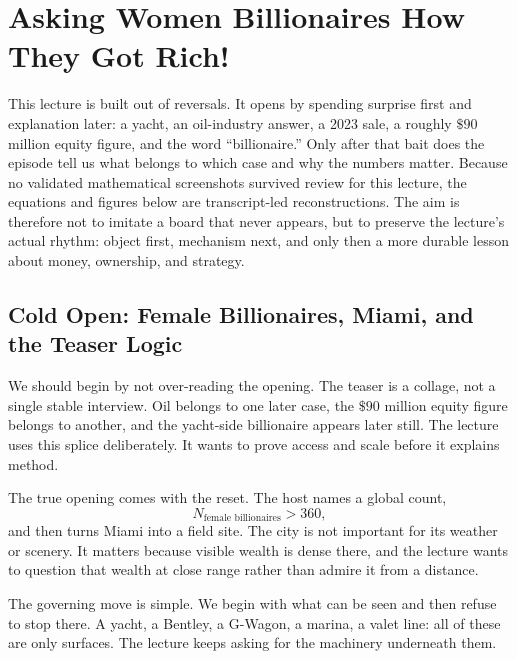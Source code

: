 \chapter{Asking Women Billionaires How They Got Rich!}

This lecture is built out of reversals. It opens by spending surprise first and explanation later: a yacht, an oil-industry answer, a 2023 sale, a roughly \(\$90\) million equity figure, and the word ``billionaire.'' Only after that bait does the episode tell us what belongs to which case and why the numbers matter. Because no validated mathematical screenshots survived review for this lecture, the equations and figures below are transcript-led reconstructions. The aim is therefore not to imitate a board that never appears, but to preserve the lecture's actual rhythm: object first, mechanism next, and only then a more durable lesson about money, ownership, and strategy.

\section{Cold Open: Female Billionaires, Miami, and the Teaser Logic}

We should begin by not over-reading the opening. The teaser is a collage, not a single stable interview. Oil belongs to one later case, the \(\$90\) million equity figure belongs to another, and the yacht-side billionaire appears later still. The lecture uses this splice deliberately. It wants to prove access and scale before it explains method.

The true opening comes with the reset. The host names a global count,
\begin{equation}
N_{\text{female billionaires}} > 360,
\end{equation}
and then turns Miami into a field site. The city is not important for its weather or scenery. It matters because visible wealth is dense there, and the lecture wants to question that wealth at close range rather than admire it from a distance.

The governing move is simple. We begin with what can be seen and then refuse to stop there. A yacht, a Bentley, a G-Wagon, a marina, a valet line: all of these are only surfaces. The lecture keeps asking for the machinery underneath them.

